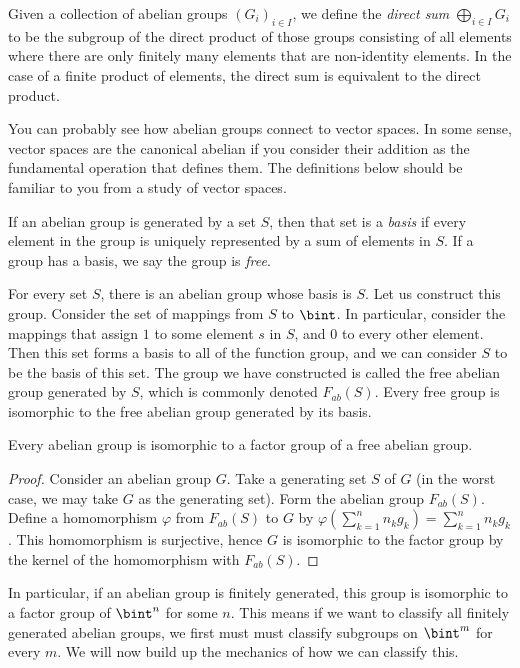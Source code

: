 Given a collection of abelian groups $(G_i)_{i \in I}$, we define the \emph{direct sum} $\bigoplus_{i \in I} G_i$ to be the subgroup of the direct product of those groups consisting of all elements where there are only finitely many elements that are non-identity elements. In the case of a finite product of elements, the direct sum is equivalent to the direct product.

You can probably see how abelian groups connect to vector spaces. In some sense, vector spaces are the canonical abelian if you consider their addition as the fundamental operation that defines them. The definitions below should be familiar to you from a study of vector spaces.

If an abelian group is generated by a set $S$, then that set is a \emph{basis} if every element in the group is uniquely represented by a sum of elements in $S$. If a group has a basis, we say the group is \emph{free}.

For every set $S$, there is an abelian group whose basis is $S$. Let us construct this group. Consider the set of mappings from $S$ to $\bint$. In particular, consider the mappings that assign $1$ to some element $s$ in $S$, and $0$ to every other element. Then this set forms a basis to all of the function group, and we can consider $S$ to be the basis of this set. The group we have constructed is called the free abelian group generated by $S$, which is commonly denoted $F_{ab}(S)$. Every free group is isomorphic to the free abelian group generated by its basis.

\begin{theorem}
    Every abelian group is isomorphic to a factor group of a free abelian group.
\end{theorem}
\begin{proof}
    Consider an abelian group $G$. Take a generating set $S$ of $G$ (in the worst case, we may take $G$ as the generating set). Form the abelian group $F_{ab}(S)$. Define a homomorphism $\varphi$ from $F_{ab}(S)$ to $G$ by $\varphi(\sum_{k = 1}^n n_kg_k) = \sum_{k = 1}^n n_kg_k$. This homomorphism is surjective, hence $G$ is isomorphic to the factor group by the kernel of the homomorphism with $F_{ab}(S)$.
\end{proof}

In particular, if an abelian group is finitely generated, this group is isomorphic to a factor group of $\bint^n$ for some $n$. This means if we want to classify all finitely generated abelian groups, we first must must classify subgroups on $\bint^m$ for every $m$. We will now build up the mechanics of how we can classify this.

